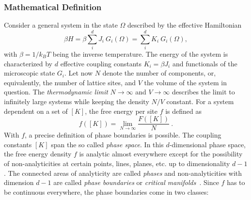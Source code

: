 	\subsubsection{Mathematical Definition}
	Consider a general system in the state $\Omega$ described by the effective Hamiltonian
	\begin{equation} \label{Eq::General-Hamiltonian}
		\beta H =	\beta \sum_{i}^{d} J_i~ G_i(\Omega) =	\sum_{i}^{d} K_i ~ G_i(\Omega),
	\end{equation}
	with $\beta =	1 /	k_B T$ being the inverse temperature. The energy of the system is characterized by $d$ effective coupling constants $K_i =	\beta J_i$ and functionals of the microscopic state $G_i$.
	Let now $N$ denote the number of components, or, equivalently, the number of lattice sites, and $V$ the volume of the system in question. The \textit{thermodynamic limit} $N \rightarrow \infty$ and $V \rightarrow \infty$ describes the limit to infinitely large systems while keeping the density $N/V$ constant. For a system dependent on a set of $[K]$, the free energy per site $f$ is defined as
	\begin{equation}
		f([K]) =	\lim\limits_{N \rightarrow \infty} \frac{F([K])}{N} ~.
	\end{equation}
	With $f$, a precise definition of phase boundaries is possible. The coupling constants $[K]$ span the so called \textit{phase space}. In this $d$-dimensional phase space, the free energy density $f$ is analytic almost everywhere except for the possibility of non-analyticities at certain points, lines, planes, etc. up to dimensionality $d-1$. The connected areas of analyticity are called \textit{phases} and non-analyticities with dimension $d-1$ are called \textit{phase boundaries} or \textit{critical manifolds}~\cite{goldenfeld2018lectures}. Since $f$ has to be continuous everywhere, the phase boundaries come in two classes:
